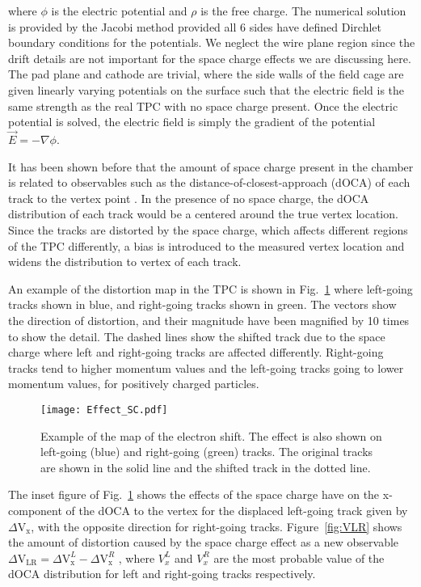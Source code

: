  where $\phi$ is the electric potential and $\rho$ is the free charge. The numerical solution is provided by the Jacobi method \cite{poisson} provided all 6 sides have defined Dirchlet boundary conditions for the potentials. We neglect the wire plane region since the drift details are not important for the space charge effects we are discussing here. The pad plane and cathode are trivial, where the side walls of the field cage are given linearly varying potentials on the surface such that the electric field is the same strength as the real TPC with no space charge present. Once the electric potential is solved, the electric field is simply the gradient of the potential  $\vec{E}= -\nabla \phi$. 
 
It has been shown before that the amount of space charge present in the chamber is related to observables such as the distance-of-closest-approach (dOCA) of each track to the vertex point \cite{starSC}. In the presence of no space charge, the dOCA distribution of each track would be a centered around the true vertex location. Since the tracks are distorted by the space charge, which affects different regions of the TPC differently, a bias is introduced to the measured vertex location and widens the distribution to vertex of each track.  

An example of the distortion map in the TPC is shown in Fig.~\ref{fig:sc_shift} where left-going tracks shown in blue, and right-going tracks shown in green. The vectors show the direction of distortion, and their magnitude have been magnified by 10 times to show the detail. The dashed lines show the shifted track due to the space charge where left and right-going tracks are affected differently. Right-going tracks tend to higher momentum values and the left-going tracks going to lower momentum values, for positively charged particles.  
 

\begin{figure}[!htb]
\centering
\texttt{[image: Effect\_SC.pdf]}
\caption{Example of the map of the electron shift. The effect is also shown on left-going (blue) and right-going (green) tracks. The original tracks are shown in the solid line and the shifted track in the dotted line.}
\label{fig:sc_shift}
\end{figure}

The inset figure of Fig.~\ref{fig:sc_shift} shows the effects of the space charge have on the x-component of the dOCA to the vertex for the displaced left-going track given by $\Delta\mathrm{V}_\mathrm{x}$, with the opposite direction for right-going tracks. Figure~\ref{fig:VLR} shows the amount of distortion caused by the space charge effect as a new observable $\Delta\mathrm{V}_\mathrm{LR} = \Delta\mathrm{V}_\mathrm{x}^L - \Delta\mathrm{V}_\mathrm{x}^R$ , where  $V_x^L$ and $V_x^R$ are the most probable value of the dOCA distribution for left and right-going tracks respectively. 

